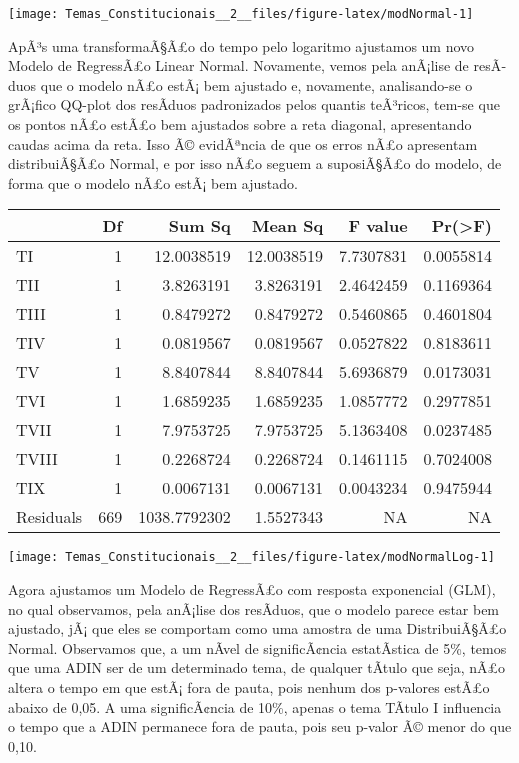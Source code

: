 \documentclass[]{article}
\begin{document}
\begin{center}\texttt{[image: Temas\_Constitucionais\_\_2\_\_files/figure-latex/modNormal-1]} \end{center}

ApÃ³s uma transformaÃ§Ã£o do tempo pelo logaritmo ajustamos um novo
Modelo de RegressÃ£o Linear Normal. Novamente, vemos pela anÃ¡lise de
resÃ­duos que o modelo nÃ£o estÃ¡ bem ajustado e, novamente,
analisando-se o grÃ¡fico QQ-plot dos resÃ­duos padronizados pelos
quantis teÃ³ricos, tem-se que os pontos nÃ£o estÃ£o bem ajustados sobre
a reta diagonal, apresentando caudas acima da reta. Isso Ã© evidÃªncia
de que os erros nÃ£o apresentam distribuiÃ§Ã£o Normal, e por isso nÃ£o
seguem a suposiÃ§Ã£o do modelo, de forma que o modelo nÃ£o estÃ¡ bem
ajustado.

\begin{longtable}[]{@{}lrrrrr@{}}
\toprule
& Df & Sum Sq & Mean Sq & F value & Pr(\textgreater{}F)\tabularnewline
\midrule
\endhead
TI & 1 & 12.0038519 & 12.0038519 & 7.7307831 & 0.0055814\tabularnewline
TII & 1 & 3.8263191 & 3.8263191 & 2.4642459 & 0.1169364\tabularnewline
TIII & 1 & 0.8479272 & 0.8479272 & 0.5460865 & 0.4601804\tabularnewline
TIV & 1 & 0.0819567 & 0.0819567 & 0.0527822 & 0.8183611\tabularnewline
TV & 1 & 8.8407844 & 8.8407844 & 5.6936879 & 0.0173031\tabularnewline
TVI & 1 & 1.6859235 & 1.6859235 & 1.0857772 & 0.2977851\tabularnewline
TVII & 1 & 7.9753725 & 7.9753725 & 5.1363408 & 0.0237485\tabularnewline
TVIII & 1 & 0.2268724 & 0.2268724 & 0.1461115 & 0.7024008\tabularnewline
TIX & 1 & 0.0067131 & 0.0067131 & 0.0043234 & 0.9475944\tabularnewline
Residuals & 669 & 1038.7792302 & 1.5527343 & NA & NA\tabularnewline
\bottomrule
\end{longtable}

\begin{center}\texttt{[image: Temas\_Constitucionais\_\_2\_\_files/figure-latex/modNormalLog-1]} \end{center}

Agora ajustamos um Modelo de RegressÃ£o com resposta exponencial (GLM),
no qual observamos, pela anÃ¡lise dos resÃ­duos, que o modelo parece
estar bem ajustado, jÃ¡ que eles se comportam como uma amostra de uma
DistribuiÃ§Ã£o Normal. Observamos que, a um nÃ­vel de significÃ¢ncia
estatÃ­stica de 5\%, temos que uma ADIN ser de um determinado tema, de
qualquer tÃ­tulo que seja, nÃ£o altera o tempo em que estÃ¡ fora de
pauta, pois nenhum dos p-valores estÃ£o abaixo de 0,05. A uma
significÃ¢ncia de 10\%, apenas o tema TÃ­tulo I influencia o tempo que a
ADIN permanece fora de pauta, pois seu p-valor Ã© menor do que 0,10.
\end{document}
